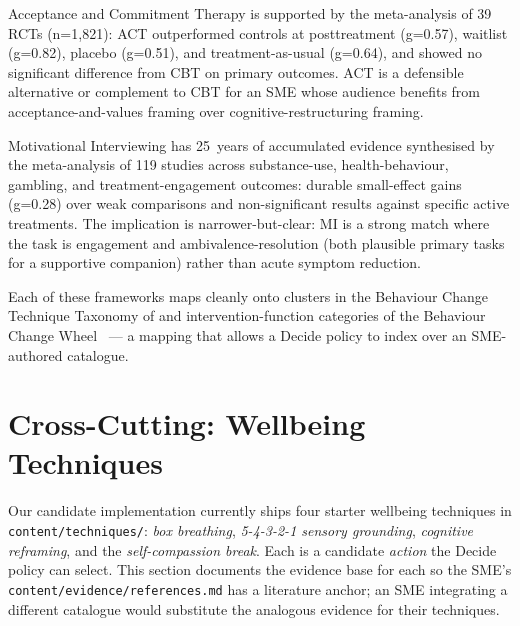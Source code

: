 \documentclass[10pt,conference]{article}
\begin{document}
Acceptance and Commitment Therapy is supported by the
\cite{ATjak2015ACTMeta} meta-analysis of 39 RCTs (n=1,821): ACT
outperformed controls at posttreatment (g=0.57), waitlist (g=0.82),
placebo (g=0.51), and treatment-as-usual (g=0.64), and showed no
significant difference from CBT on primary outcomes. ACT is a
defensible alternative or complement to CBT for an SME whose audience
benefits from acceptance-and-values framing over
cognitive-restructuring framing.

Motivational Interviewing has 25~years of accumulated evidence
synthesised by the \cite{Lundahl2010MIMeta} meta-analysis of 119
studies across substance-use, health-behaviour, gambling, and
treatment-engagement outcomes: durable small-effect gains (g=0.28)
over weak comparisons and non-significant results against specific
active treatments. The implication is narrower-but-clear: MI is a
strong match where the task is engagement and ambivalence-resolution
(both plausible primary tasks for a supportive companion) rather than
acute symptom reduction.

Each of these frameworks maps cleanly onto clusters in the Behaviour
Change Technique Taxonomy of \cite{Michie2013BCTTaxonomy} and
intervention-function categories of the Behaviour Change
Wheel~\cite{Michie2011BCW} --- a mapping that allows a Decide policy
to index over an SME-authored catalogue.

\section{Cross-Cutting: Wellbeing Techniques}\label{sec:techniques}

Our candidate implementation currently ships four starter wellbeing
techniques in \texttt{content/techniques/}: \emph{box breathing},
\emph{5-4-3-2-1 sensory grounding}, \emph{cognitive reframing}, and
the \emph{self-compassion break}. Each is a candidate \emph{action}
the Decide policy can select. This section documents the evidence
base for each so the SME's \texttt{content/evidence/references.md}
has a literature anchor; an SME integrating a different catalogue
would substitute the analogous evidence for their techniques.
\end{document}
